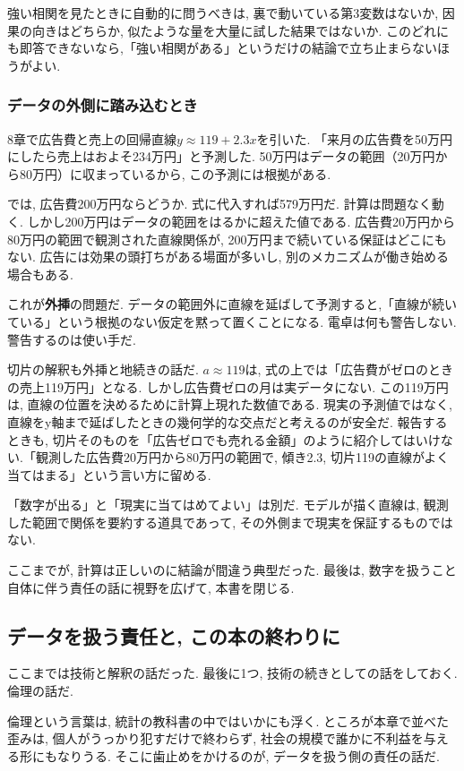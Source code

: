 強い相関を見たときに自動的に問うべきは, 裏で動いている第3変数はないか, 因果の向きはどちらか, 似たような量を大量に試した結果ではないか.
このどれにも即答できないなら,「強い相関がある」というだけの結論で立ち止まらないほうがよい.

\subsubsection*{データの外側に踏み込むとき}

8章で広告費と売上の回帰直線$y \approx 119 + 2.3x$を引いた.
「来月の広告費を50万円にしたら売上はおよそ234万円」と予測した.
50万円はデータの範囲（20万円から80万円）に収まっているから, この予測には根拠がある.

では, 広告費200万円ならどうか.
式に代入すれば579万円だ. 計算は問題なく動く.
しかし200万円はデータの範囲をはるかに超えた値である.
広告費20万円から80万円の範囲で観測された直線関係が, 200万円まで続いている保証はどこにもない.
広告には効果の頭打ちがある場面が多いし, 別のメカニズムが働き始める場合もある.

これが\textbf{外挿}の問題だ.
データの範囲外に直線を延ばして予測すると,「直線が続いている」という根拠のない仮定を黙って置くことになる.
電卓は何も警告しない. 警告するのは使い手だ.

切片の解釈も外挿と地続きの話だ.
$a \approx 119$は, 式の上では「広告費がゼロのときの売上119万円」となる.
しかし広告費ゼロの月は実データにない.
この119万円は, 直線の位置を決めるために計算上現れた数値である. 現実の予測値ではなく, 直線をy軸まで延ばしたときの幾何学的な交点だと考えるのが安全だ.
報告するときも, 切片そのものを「広告ゼロでも売れる金額」のように紹介してはいけない.「観測した広告費20万円から80万円の範囲で, 傾き2.3, 切片119の直線がよく当てはまる」という言い方に留める.

「数字が出る」と「現実に当てはめてよい」は別だ.
モデルが描く直線は, 観測した範囲で関係を要約する道具であって, その外側まで現実を保証するものではない.

ここまでが, 計算は正しいのに結論が間違う典型だった.
最後は, 数字を扱うこと自体に伴う責任の話に視野を広げて, 本書を閉じる.


\subsection{データを扱う責任と, この本の終わりに}

ここまでは技術と解釈の話だった.
最後に1つ, 技術の続きとしての話をしておく. 倫理の話だ.

倫理という言葉は, 統計の教科書の中ではいかにも浮く.
ところが本章で並べた歪みは, 個人がうっかり犯すだけで終わらず, 社会の規模で誰かに不利益を与える形にもなりうる.
そこに歯止めをかけるのが, データを扱う側の責任の話だ.

